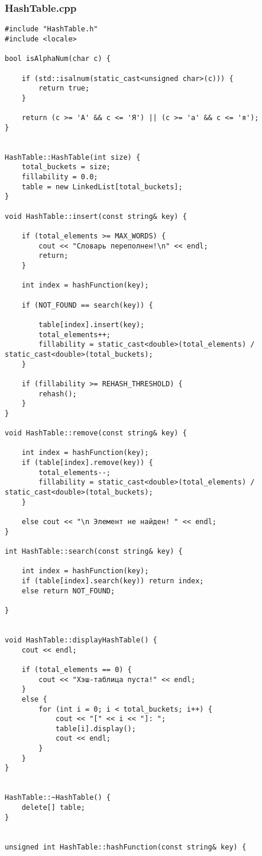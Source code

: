 \documentclass[11pt,a4paper,final]{article} %
\begin{document}
\subsubsection*{HashTable.cpp}
\begin{lstlisting}
#include "HashTable.h"
#include <locale>

bool isAlphaNum(char c) {
	
	if (std::isalnum(static_cast<unsigned char>(c))) {
		return true;
	}
	
	return (c >= 'А' && c <= 'Я') || (c >= 'а' && c <= 'я');
}


HashTable::HashTable(int size) {
	total_buckets = size;
	fillability = 0.0;
	table = new LinkedList[total_buckets];
}

void HashTable::insert(const string& key) {
	
	if (total_elements >= MAX_WORDS) {
		cout << "Словарь переполнен!\n" << endl;
		return;
	}
	
	int index = hashFunction(key);
	
	if (NOT_FOUND == search(key)) {
		
		table[index].insert(key);
		total_elements++;
		fillability = static_cast<double>(total_elements) / static_cast<double>(total_buckets);
	}
	
	if (fillability >= REHASH_THRESHOLD) {
		rehash();
	}
}

void HashTable::remove(const string& key) {
	
	int index = hashFunction(key);
	if (table[index].remove(key)) {
		total_elements--;
		fillability = static_cast<double>(total_elements) / static_cast<double>(total_buckets);
	}
	
	else cout << "\n Элемент не найден! " << endl;
}

int HashTable::search(const string& key) {
	
	int index = hashFunction(key);
	if (table[index].search(key)) return index;
	else return NOT_FOUND;
	
}


void HashTable::displayHashTable() {
	cout << endl;
	
	if (total_elements == 0) {
		cout << "Хэш-таблица пуста!" << endl;
	}
	else {
		for (int i = 0; i < total_buckets; i++) {
			cout << "[" << i << "]: ";
			table[i].display();
			cout << endl;
		}
	}
}


HashTable::~HashTable() {
	delete[] table;
}


unsigned int HashTable::hashFunction(const string& key) {
	

\end{lstlisting}
\end{document}
